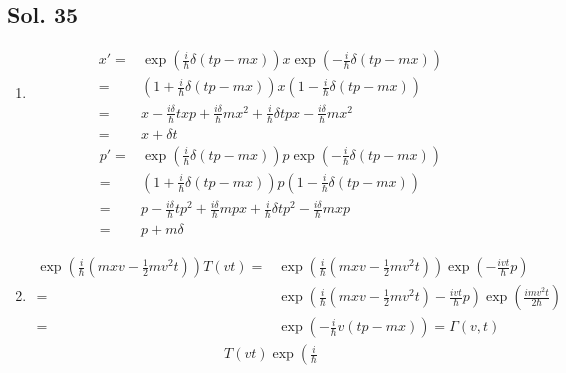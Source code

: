 \subsection*{Sol. 35}
\begin{enumerate}
    \item 
    \begin{align*}
        x' =& 
        \exp\left(
        \frac{i}{\hbar}
        \delta(tp-mx)
        \right)x
        \exp\left(
        -\frac{i}{\hbar}
        \delta(tp-mx)
        \right)\\
        =&
        \left(
        1+\frac{i}{\hbar}
        \delta(tp-mx)
        \right)
        x
        \left(
        1-\frac{i}{\hbar}
        \delta(tp-mx)
        \right)\\
        =&
        x-\frac{i\delta}{\hbar}txp + 
        \frac{i\delta}{\hbar}mx^2
        +\frac{i}{\hbar}\delta tpx 
        -\frac{i\delta}{\hbar}mx^2\\
        =&x+\delta t
    \end{align*}
    \begin{align*}
        p' = &
        \exp\left(
        \frac{i}{\hbar}
        \delta(tp-mx)
        \right)p
        \exp\left(
        -\frac{i}{\hbar}
        \delta(tp-mx)
        \right)\\
        =&
        \left(
        1+\frac{i}{\hbar}
        \delta(tp-mx)
        \right)
        p
        \left(
        1-\frac{i}{\hbar}
        \delta(tp-mx)
        \right)\\
        =&
        p-\frac{i\delta}{\hbar}tp^2 + 
        \frac{i\delta}{\hbar}mpx
        +\frac{i}{\hbar}\delta tp^2 
        -\frac{i\delta}{\hbar}mxp\\
        =&p+m\delta
    \end{align*}
    \item 
    \begin{align*}
        \exp\left(\frac{i}{\hbar}
        (mxv-\frac{1}{2}mv^2t)\right)T(vt)
        =&
        \exp\left(\frac{i}{\hbar}
        (mxv-\frac{1}{2}mv^2t)\right)
        \exp\left(-\frac{ivt}{\hbar}p\right)\\
        =&\exp\left(
        \frac{i}{\hbar}
        (mxv-\frac{1}{2}mv^2t)
        -\frac{ivt}{\hbar}p
        \right)
        \exp(\frac{i mv^2 t}{2\hbar})\\
        =&\exp\left(
        -\frac{i}{\hbar}v(tp-mx)
        \right) = \Gamma(v,t)
    \end{align*}
    \begin{align*}
        T(vt)\exp\left(\frac{i}{\hbar}

\end{align*}
\end{enumerate}
